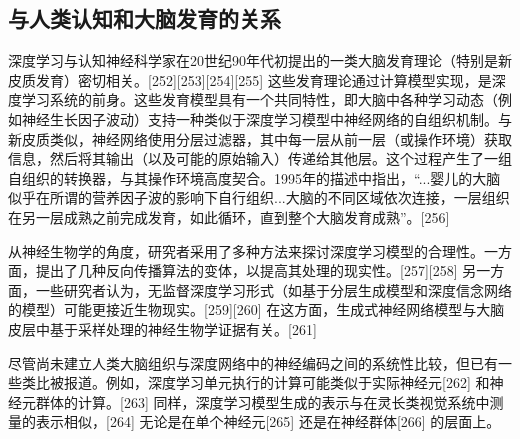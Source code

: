 \subsection{与人类认知和大脑发育的关系}  
深度学习与认知神经科学家在20世纪90年代初提出的一类大脑发育理论（特别是新皮质发育）密切相关。[252][253][254][255] 这些发育理论通过计算模型实现，是深度学习系统的前身。这些发育模型具有一个共同特性，即大脑中各种学习动态（例如神经生长因子波动）支持一种类似于深度学习模型中神经网络的自组织机制。与新皮质类似，神经网络使用分层过滤器，其中每一层从前一层（或操作环境）获取信息，然后将其输出（以及可能的原始输入）传递给其他层。这个过程产生了一组自组织的转换器，与其操作环境高度契合。1995年的描述中指出，“...婴儿的大脑似乎在所谓的营养因子波的影响下自行组织...大脑的不同区域依次连接，一层组织在另一层成熟之前完成发育，如此循环，直到整个大脑发育成熟”。[256]  

从神经生物学的角度，研究者采用了多种方法来探讨深度学习模型的合理性。一方面，提出了几种反向传播算法的变体，以提高其处理的现实性。[257][258] 另一方面，一些研究者认为，无监督深度学习形式（如基于分层生成模型和深度信念网络的模型）可能更接近生物现实。[259][260] 在这方面，生成式神经网络模型与大脑皮层中基于采样处理的神经生物学证据有关。[261]  

尽管尚未建立人类大脑组织与深度网络中的神经编码之间的系统性比较，但已有一些类比被报道。例如，深度学习单元执行的计算可能类似于实际神经元[262] 和神经元群体的计算。[263] 同样，深度学习模型生成的表示与在灵长类视觉系统中测量的表示相似，[264] 无论是在单个神经元[265] 还是在神经群体[266] 的层面上。
